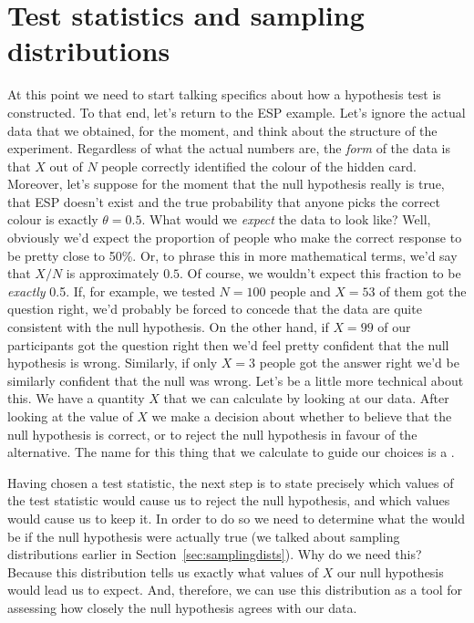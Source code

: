 \section{Test statistics and sampling distributions~\label{sec:teststatistics}} 

At this point we need to start talking specifics about how a hypothesis test is constructed. To that end, let's return to the ESP example. Let's ignore the actual data that we obtained, for the moment, and think about the structure of the experiment. Regardless of what the actual numbers are, the {\it form} of the data is that $X$ out of $N$ people correctly identified the colour of the hidden card. Moreover, let's suppose for the moment that the null hypothesis really is true, that ESP doesn't exist and the true probability that anyone picks the correct colour is exactly $\theta = 0.5$. What would we {\it expect} the data to look like? Well, obviously we'd expect the proportion of people who make the correct response to be pretty close to 50\%. Or, to phrase this in more mathematical terms, we'd say that $X/N$ is approximately $0.5$. Of course, we wouldn't expect this fraction to be {\it exactly} 0.5. If, for example, we tested $N=100$ people and $X = 53$ of them got the question right, we'd probably be forced to concede that the data are quite consistent with the null hypothesis. On the other hand, if $X = 99$ of our participants got the question right then we'd feel pretty confident that the null hypothesis is wrong. Similarly, if only $X=3$ people got the answer right we'd be similarly confident that the null was wrong. Let's be a little more technical about this. We have a quantity $X$ that we can calculate by looking at our data. After looking at the value of $X$ we make a decision about whether to believe that the null hypothesis is correct, or to reject the null hypothesis in favour of the alternative. The name for this thing that we calculate to guide our choices is a . 

Having chosen a test statistic, the next step is to state precisely which values of the test statistic would cause us to reject the null hypothesis, and which values would cause us to keep it. In order to do so we need to determine what the  would be if the null hypothesis were actually true (we talked about sampling distributions earlier in Section~\ref{sec:samplingdists}). Why do we need this? Because this distribution tells us exactly what values of $X$ our null hypothesis would lead us to expect. And, therefore, we can use this distribution as a tool for assessing how closely the null hypothesis agrees with our data. 

